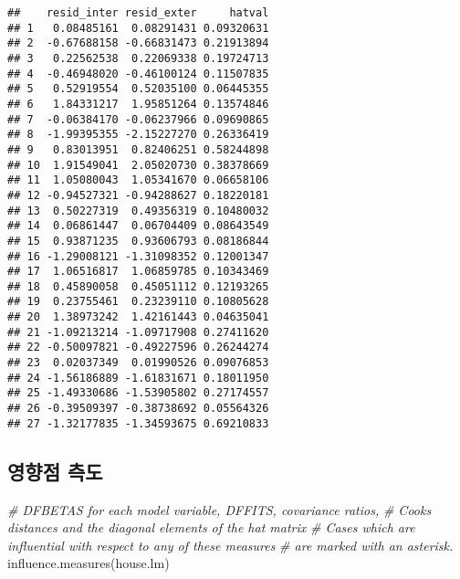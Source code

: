 \documentclass[
]{book}
\newenvironment{Shaded}{\begin{snugshade}}{\end{snugshade}}
\newcommand{\CommentTok}[1]{\textcolor[rgb]{0.56,0.35,0.01}{\textit{#1}}}
\newcommand{\FunctionTok}[1]{\textcolor[rgb]{0.00,0.00,0.00}{#1}}
\newcommand{\NormalTok}[1]{#1}
\begin{document}
\begin{verbatim}
##    resid_inter resid_exter     hatval
## 1   0.08485161  0.08291431 0.09320631
## 2  -0.67688158 -0.66831473 0.21913894
## 3   0.22562538  0.22069338 0.19724713
## 4  -0.46948020 -0.46100124 0.11507835
## 5   0.52919554  0.52035100 0.06445355
## 6   1.84331217  1.95851264 0.13574846
## 7  -0.06384170 -0.06237966 0.09690865
## 8  -1.99395355 -2.15227270 0.26336419
## 9   0.83013951  0.82406251 0.58244898
## 10  1.91549041  2.05020730 0.38378669
## 11  1.05080043  1.05341670 0.06658106
## 12 -0.94527321 -0.94288627 0.18220181
## 13  0.50227319  0.49356319 0.10480032
## 14  0.06861447  0.06704409 0.08643549
## 15  0.93871235  0.93606793 0.08186844
## 16 -1.29008121 -1.31098352 0.12001347
## 17  1.06516817  1.06859785 0.10343469
## 18  0.45890058  0.45051112 0.12193265
## 19  0.23755461  0.23239110 0.10805628
## 20  1.38973242  1.42161443 0.04635041
## 21 -1.09213214 -1.09717908 0.27411620
## 22 -0.50097821 -0.49227596 0.26244274
## 23  0.02037349  0.01990526 0.09076853
## 24 -1.56186889 -1.61831671 0.18011950
## 25 -1.49330686 -1.53905802 0.27174557
## 26 -0.39509397 -0.38738692 0.05564326
## 27 -1.32177835 -1.34593675 0.69210833
\end{verbatim}

\hypertarget{uxc601uxd5a5uxc810-uxce21uxb3c4-1}{%
\subsection{영향점 측도}\label{uxc601uxd5a5uxc810-uxce21uxb3c4-1}}

\begin{Shaded}
\begin{Highlighting}[]
\CommentTok{\# DFBETAS for each model variable, DFFITS, covariance ratios, }
\CommentTok{\# Cook\textquotesingle{}s distances and the diagonal elements of the hat matrix}
\CommentTok{\# Cases which are influential with respect to any of these measures }
\CommentTok{\# are marked with an asterisk.}
\FunctionTok{influence.measures}\NormalTok{(house.lm)}
\end{Highlighting}
\end{Shaded}
\end{document}
